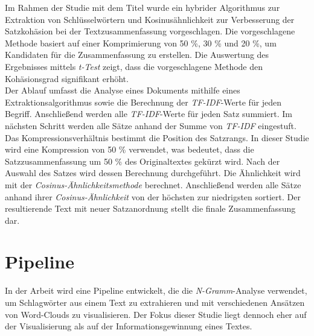 Im Rahmen der Studie mit dem Titel \cite{darmawan2015hybrid} wurde ein hybrider Algorithmus zur Extraktion von Schlüsselwörtern und Kosinusähnlichkeit zur Verbesserung der Satzkohäsion bei der Textzusammenfassung vorgeschlagen. Die vorgeschlagene Methode basiert auf einer Komprimierung von 50 \%, 30 \% und 20 \%, um Kandidaten für die Zusammenfassung zu erstellen. Die Auswertung des Ergebnisses mittels \emph{t-Test} zeigt, dass die vorgeschlagene Methode den Kohäsionsgrad signifikant erhöht.\\
Der Ablauf umfasst die Analyse eines Dokuments mithilfe eines Extraktionsalgorithmus sowie die Berechnung der \emph{TF-IDF}-Werte für jeden Begriff. Anschließend werden alle \emph{TF-IDF}-Werte für jeden Satz summiert. Im nächsten Schritt werden alle Sätze anhand der Summe von \emph{TF-IDF} eingestuft. Das Kompressionsverhältnis bestimmt die Position des Satzrangs. In dieser Studie wird eine Kompression von 50 \% verwendet, was bedeutet, dass die Satzzusammenfassung um 50 \% des Originaltextes gekürzt wird. Nach der Auswahl des Satzes wird dessen Berechnung durchgeführt. Die Ähnlichkeit wird mit der \emph{Cosinus-Ähnlichkeitsmethode} berechnet. Anschließend werden alle Sätze anhand ihrer \emph{Cosinus-Ähnlichkeit} von der höchsten zur niedrigsten sortiert. Der resultierende Text mit neuer Satzanordnung stellt die finale Zusammenfassung dar.\\


\section{Pipeline}
In der Arbeit \cite{pirk2019implementierung} wird eine Pipeline entwickelt, die die \emph{N-Gramm}-Analyse verwendet, um Schlagwörter aus einem Text zu extrahieren und mit verschiedenen Ansätzen von Word-Clouds zu visualisieren. Der Fokus dieser Studie liegt dennoch eher auf der Visualisierung als auf der Informationsgewinnung eines Textes.\\

